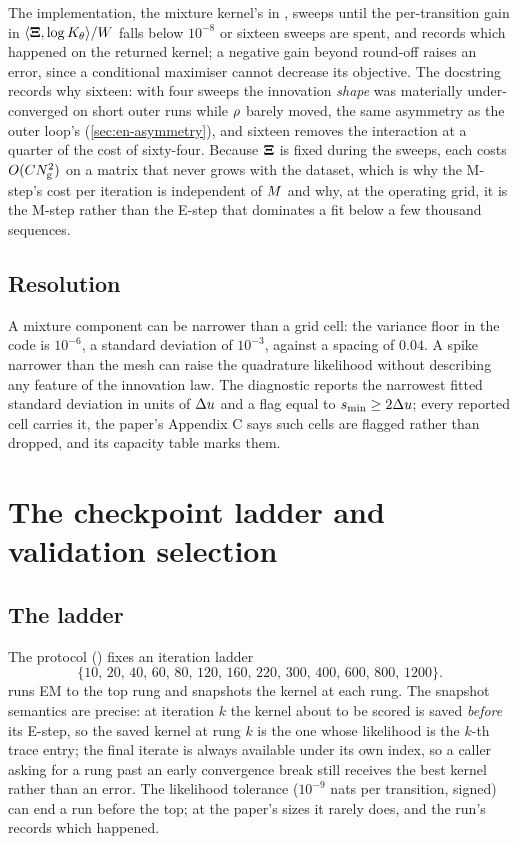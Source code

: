 The implementation, the mixture kernel's  in
, sweeps until the per-transition gain in
$\langle\mathbf{\Xi},\log K_{\theta}\rangle/W$ falls below $10^{-8}$ or sixteen sweeps are spent,
and records which happened on the returned kernel; a negative gain beyond round-off
raises an error, since a conditional maximiser cannot decrease its objective. The
docstring records why sixteen: with four sweeps the innovation \emph{shape} was
materially under-converged on short outer runs while $\rho$ barely moved, the same
asymmetry as the outer loop's (\cref{sec:en-asymmetry}), and sixteen removes the
interaction at a quarter of the cost of sixty-four. Because $\mathbf{\Xi}$ is fixed during the
sweeps, each costs $O(CN_{\mathrm{g}}^2)$ on a matrix that never grows with the dataset,
which is why the M-step's cost per iteration is independent of $M$ and why, at the
operating grid, it is the M-step rather than the E-step that dominates a fit below a
few thousand sequences.

\subsection{Resolution}

A mixture component can be narrower than a grid cell: the variance floor in the code
is $10^{-6}$, a standard deviation of $10^{-3}$, against a spacing of $0.04$. A spike
narrower than the mesh can raise the quadrature likelihood without describing any
feature of the innovation law. The diagnostic  reports the
narrowest fitted standard deviation in units of $\Delta u$ and a flag
 equal to $s_{\min}\ge2\Delta u$; every reported cell carries it, the paper's
Appendix C says such cells are flagged rather than dropped, and its capacity table
marks them.

\section{The checkpoint ladder and validation selection}

\subsection{The ladder}

The protocol () fixes an iteration ladder
\[
  \{10,\,20,\,40,\,60,\,80,\,120,\,160,\,220,\,300,\,400,\,600,\,800,\,1200\}.
\]
 runs EM to the top rung and snapshots the kernel at each rung. The snapshot semantics are precise: at
iteration $k$ the kernel about to be scored is saved \emph{before} its E-step, so the
saved kernel at rung $k$ is the one whose likelihood is the $k$-th trace entry; the
final iterate is always available under its own index, so a caller asking for a rung
past an early convergence break still receives the best kernel rather than an error.
The likelihood tolerance ($10^{-9}$ nats per transition, signed) can end a run before
the top; at the paper's sizes it rarely does, and the run's  records
which happened.

